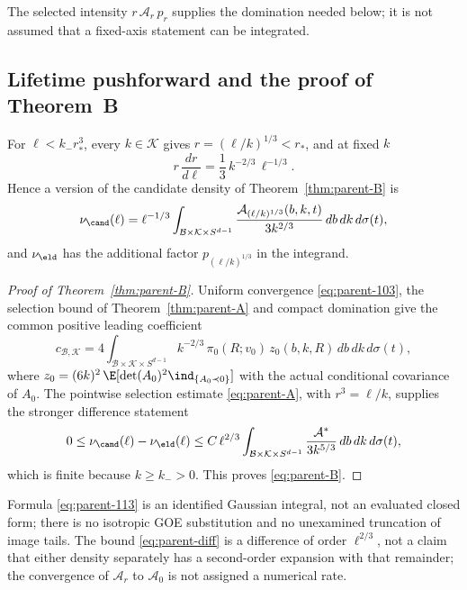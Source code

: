 The selected intensity $r\,\mathcal A_r\,p_r$ supplies the domination needed below; it is not assumed that a fixed-axis statement can be integrated.

\subsection{Lifetime pushforward and the proof of Theorem~B}\label{ssec:parent-B}

\begin{proposition}\label{prop:parent-push}
For $\ell<k_-r_*^3$, every $k\in\mathcal K$ gives $r=(\ell/k)^{1/3}<r_*$, and at fixed $k$
\begin{equation}\label{eq:parent-111}
r\,\frac{dr}{d\ell}=\frac13\,k^{-2/3}\,\ell^{-1/3}.
\end{equation}
Hence a version of the candidate density of Theorem~\ref{thm:parent-B} is
\begin{equation}\label{eq:parent-112}
\nu_\cand(\ell)=\ell^{-1/3}\int_{\mathcal B\times\mathcal K\times S^{d-1}}\frac{\mathcal A_{(\ell/k)^{1/3}}(b,k,t)}{3k^{2/3}}\,db\,dk\,d\sigma(t),
\end{equation}
and $\nu_\eld$ has the additional factor $p_{(\ell/k)^{1/3}}$ in the integrand.
\end{proposition}

\begin{proof}[Proof of Theorem~\ref{thm:parent-B}]
Uniform convergence \eqref{eq:parent-103}, the selection bound of Theorem~\ref{thm:parent-A} and compact domination give the common positive leading coefficient
\begin{equation}\label{eq:parent-113}
c_{\mathcal B,\mathcal K}=4\int_{\mathcal B\times\mathcal K\times S^{d-1}}k^{-2/3}\,\pi_0(R;v_0)\,z_0(b,k,R)\,db\,dk\,d\sigma(t),
\end{equation}
where $z_0=(6k)^2\,\E[\det(A_0)^2\ind_{\{A_0\prec0\}}]$ with the actual conditional covariance of $A_0$. The pointwise selection estimate \eqref{eq:parent-A}, with $r^3=\ell/k$, supplies the stronger difference statement
\begin{equation}\label{eq:parent-diff}
0\le\nu_\cand(\ell)-\nu_\eld(\ell)\le C\,\ell^{2/3}\int_{\mathcal B\times\mathcal K\times S^{d-1}}\frac{\mathcal A^*}{3k^{5/3}}\,db\,dk\,d\sigma(t),
\end{equation}
which is finite because $k\ge k_->0$. This proves \eqref{eq:parent-B}.
\end{proof}

Formula \eqref{eq:parent-113} is an identified Gaussian integral, not an evaluated closed form; there is no isotropic GOE substitution and no unexamined truncation of image tails. The bound \eqref{eq:parent-diff} is a difference of order $\ell^{2/3}$, not a claim that either density separately has a second-order expansion with that remainder; the convergence of $\mathcal A_r$ to $\mathcal A_0$ is not assigned a numerical rate.

